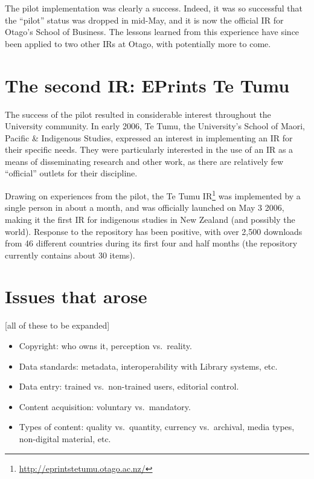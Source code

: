 \documentclass[12pt,pdftex,a4paper,titlepage]{article}
\begin{document}
The pilot implementation was clearly a success. Indeed, it was so successful that the ``pilot'' status was dropped in mid-May, and it is now the official IR for Otago's School of Business. The lessons learned from this experience have since been applied to two other IRs at Otago, with potentially more to come.


\section{The second IR: EPrints Te Tumu}

The success of the pilot resulted in considerable interest throughout the University community. In early 2006, Te Tumu, the University's School of Maori, Pacific \& Indigenous Studies, expressed an interest in implementing an IR for their specific needs. They were particularly interested in the use of an IR as a means of disseminating research and other work, as there are relatively few ``official'' outlets for their discipline.

Drawing on experiences from the pilot, the Te Tumu IR\footnote{\url{http://eprintstetumu.otago.ac.nz/}} was implemented by a single person in about a month, and was officially launched on May 3 2006, making it the first IR for indigenous studies in New Zealand (and possibly the world). Response to the repository has been positive, with over 2,500 downloads from 46 different countries during its first four and half months (the repository currently contains about 30 items).


\section{Issues that arose}

[all of these to be expanded]

\begin{itemize}

	\item Copyright: who owns it, perception vs.\ reality.

	\item Data standards: metadata, interoperability with Library systems, etc.

	\item Data entry: trained vs.\ non-trained users, editorial control.

	\item Content acquisition: voluntary vs.\ mandatory.

	\item Types of content: quality vs.\ quantity, currency vs.\ archival, media types, non-digital material, etc.

\end{itemize}
\end{document}
